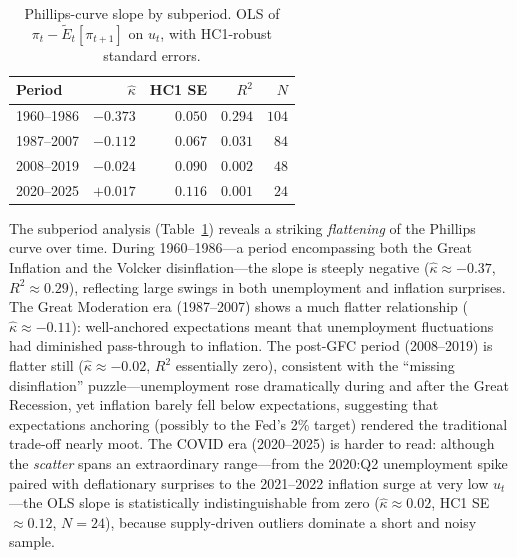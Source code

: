 \documentclass[dvipsnames,11pt]{article}
\begin{document}
\begin{enumerate}
\begin{solution}
                    \begin{table}[H]
                        \centering
                        \small
                        \begin{tabular}{lrrrr}
                            \toprule
                            Period & $\hat{\kappa}$ & HC1 SE & $R^2$ & $N$ \\
                            \midrule
                            1960--1986 & $-0.373$ & $0.050$ & $0.294$ & $104$ \\
                            1987--2007 & $-0.112$ & $0.067$ & $0.031$ & $84$ \\
                            2008--2019 & $-0.024$ & $0.090$ & $0.002$ & $48$ \\
                            2020--2025 & $+0.017$ & $0.116$ & $0.001$ & $24$ \\
                            \bottomrule
                        \end{tabular}
                        \caption{Phillips-curve slope by subperiod. OLS of $\pi_t-\tilde{E}_t[\pi_{t+1}]$ on $u_t$, with HC1-robust standard errors.}
                        \label{tab:q3-subperiods}
                    \end{table}

                    The subperiod analysis (Table~\ref{tab:q3-subperiods}) reveals a striking \emph{flattening} of the Phillips curve over time. During 1960--1986---a period encompassing both the Great Inflation and the Volcker disinflation---the slope is steeply negative ($\hat{\kappa}\approx-0.37$, $R^2\approx0.29$), reflecting large swings in both unemployment and inflation surprises. The Great Moderation era (1987--2007) shows a much flatter relationship ($\hat{\kappa}\approx-0.11$): well-anchored expectations meant that unemployment fluctuations had diminished pass-through to inflation. The post-GFC period (2008--2019) is flatter still ($\hat{\kappa}\approx-0.02$, $R^2$ essentially zero), consistent with the ``missing disinflation'' puzzle---unemployment rose dramatically during and after the Great Recession, yet inflation barely fell below expectations, suggesting that expectations anchoring (possibly to the Fed's 2\% target) rendered the traditional trade-off nearly moot. The COVID era (2020--2025) is harder to read: although the \emph{scatter} spans an extraordinary range---from the 2020:Q2 unemployment spike paired with deflationary surprises to the 2021--2022 inflation surge at very low $u_t$---the OLS slope is statistically indistinguishable from zero ($\hat{\kappa}\approx 0.02$, HC1 SE $\approx 0.12$, $N=24$), because supply-driven outliers dominate a short and noisy sample.


\end{solution}
\end{enumerate}
\end{document}
